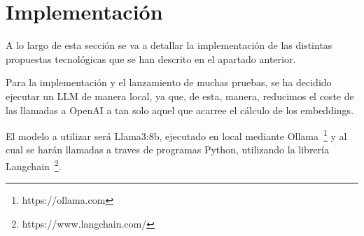 \section{Implementación}
A lo largo de esta sección se va a detallar la implementación de las distintas propuestas tecnológicas que se han descrito en el apartado anterior.

Para la implementación y el lanzamiento de muchas pruebas, se ha decidido ejecutar un LLM de manera local, ya que, de esta, manera, reducimos el coste de las llamadas a OpenAI a tan solo aquel que acarree el cálculo de los embeddings.

El modelo a utilizar será Llama3:8b, ejecutado en local mediante Ollama~\footnote{https://ollama.com} y al cual se harán llamadas a traves de programas Python, utilizando la librería Langchain~\footnote{https://www.langchain.com/}.


